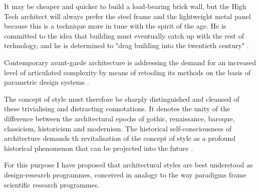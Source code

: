 



It may be cheaper and quicker to build a load-bearing brick wall, but
the High Tech architect will always prefer the steel frame and the lightweight metal panel because this is a technique more in tune with the spirit of the age.
He is committed to the idea that building must eventually catch up with the rest of technology, and he is determined to "drag building into the twentieth century" \cite{Davies1988}.

Contemporary avant-garde architecture is addressing the demand for an increased level of articulated complexity by means of retooling its methods on the basis of parametric design systems \cite{Schumacher2008}.

The concept of style must therefore be sharply distinguished and cleansed of these trivialising and distracting connotations.
It denotes the unity of the difference between the architectural epochs of gothic, renaissance, baroque, classicism, historicism and modernism.
The historical self-consciousness of architecture demands th revitalisation of the concept of style as a profound historical phenomenon that can be projected into the future \cite{Schumacher2010}.


For this purpose I have proposed that architectural styles are best understood as design-research programmes, conceived in analogy to the way paradigms frame scientific research programmes. \cite{Schumacher2010}

